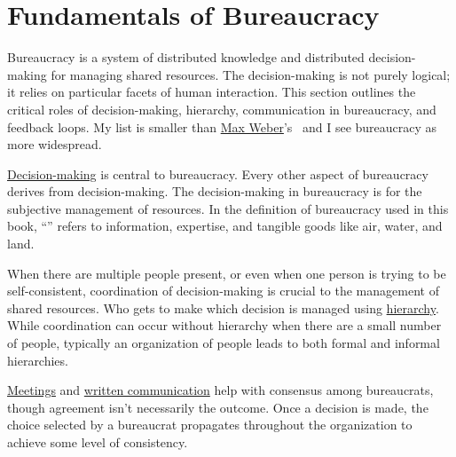 \section{Fundamentals of Bureaucracy\label{sec:fundamentals-of-b}}
  
Bureaucracy is a system of distributed knowledge and distributed decision-making for managing shared resources. The decision-making is not purely logical; it relies on particular facets of human interaction. This section outlines the critical roles of decision-making, hierarchy, communication in bureaucracy, and feedback loops. 
My list is smaller than \href{https://en.wikipedia.org/wiki/Bureaucracy\%23Max_Weber}{Max Weber}'s~\cite{2015_Weber}
 and I see bureaucracy as more widespread.

\hyperref[sec:decision-making]{Decision-making}
%
is central to bureaucracy. Every other aspect of bureaucracy derives from decision-making. The decision-making in bureaucracy is for the subjective management of resources. In the definition of bureaucracy used in this book, ``\iftoggle{glossarysubstitutionworks}{\glspl{shared resource}}{shared resources}'' 
\iftoggle{glossaryinmargin}{\marginpar{[Glossary]}}{}%
refers to information, expertise, and tangible goods like air, water, and land. 

When there are multiple people present, or even when one person is trying to be self-consistent, coordination of decision-making is crucial to the management of shared resources. Who gets to make which decision is managed using
\hyperref[sec:hierarchy-of-roles]{hierarchy}.
%
While coordination can occur without hierarchy when there are a small number of people, typically an organization of people leads to both formal and informal hierarchies. 

\hyperref[sec:meetings-for-coordination]{Meetings} and 
%
\hyperref[sec:written-communication]{written communication} help with consensus among bureaucrats, though agreement isn't necessarily the outcome.
Once a decision is made, the choice selected by a bureaucrat propagates throughout the organization to achieve some level of consistency. 

